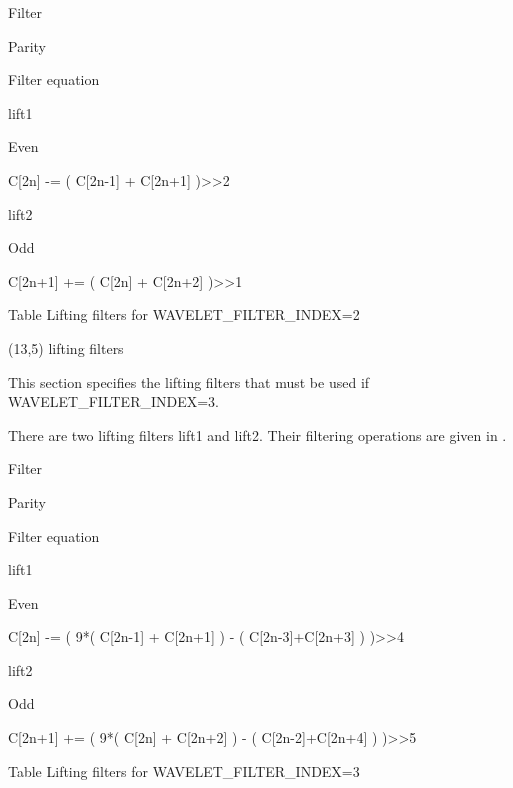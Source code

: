Filter

Parity

Filter equation

lift1

Even

C[2n] -=  ( C[2n-1] + C[2n+1] )>>2

lift2

Odd

C[2n+1] += ( C[2n] + C[2n+2]  )>>1


Table   Lifting filters for WAVELET\_FILTER\_INDEX=2


    (13,5) lifting filters

This section specifies the lifting filters that must be used if
WAVELET\_FILTER\_INDEX=3.

There are two lifting filters lift1 and lift2. Their filtering
operations are given in .


Filter

Parity

Filter equation

lift1

Even

C[2n] -= ( 9*( C[2n-1] + C[2n+1] ) - ( C[2n-3]+C[2n+3] ) )>>4

lift2

Odd

C[2n+1] += ( 9*( C[2n] + C[2n+2] ) - ( C[2n-2]+C[2n+4] ) )>>5


Table   Lifting filters for WAVELET\_FILTER\_INDEX=3


